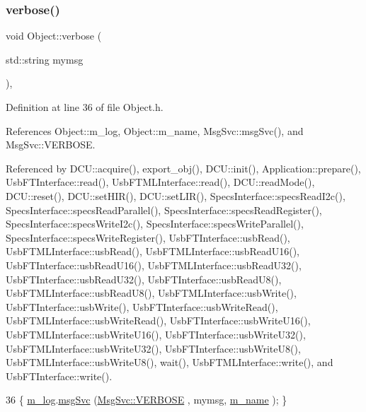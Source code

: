 \subsubsection{\texorpdfstring{verbose()}{verbose()}\hspace{0.1cm}{\footnotesize\ttfamily [1/2]}}
{\footnotesize\ttfamily void Object\+::verbose (\begin{DoxyParamCaption}\item[{std\+::string}]{mymsg }\end{DoxyParamCaption})\hspace{0.3cm}{\ttfamily [inline]}, {\ttfamily [inherited]}}



Definition at line 36 of file Object.\+h.



References Object\+::m\+\_\+log, Object\+::m\+\_\+name, Msg\+Svc\+::msg\+Svc(), and Msg\+Svc\+::\+V\+E\+R\+B\+O\+SE.



Referenced by D\+C\+U\+::acquire(), export\+\_\+obj(), D\+C\+U\+::init(), Application\+::prepare(), Usb\+F\+T\+Interface\+::read(), Usb\+F\+T\+M\+L\+Interface\+::read(), D\+C\+U\+::read\+Mode(), D\+C\+U\+::reset(), D\+C\+U\+::set\+H\+I\+R(), D\+C\+U\+::set\+L\+I\+R(), Specs\+Interface\+::specs\+Read\+I2c(), Specs\+Interface\+::specs\+Read\+Parallel(), Specs\+Interface\+::specs\+Read\+Register(), Specs\+Interface\+::specs\+Write\+I2c(), Specs\+Interface\+::specs\+Write\+Parallel(), Specs\+Interface\+::specs\+Write\+Register(), Usb\+F\+T\+Interface\+::usb\+Read(), Usb\+F\+T\+M\+L\+Interface\+::usb\+Read(), Usb\+F\+T\+M\+L\+Interface\+::usb\+Read\+U16(), Usb\+F\+T\+Interface\+::usb\+Read\+U16(), Usb\+F\+T\+M\+L\+Interface\+::usb\+Read\+U32(), Usb\+F\+T\+Interface\+::usb\+Read\+U32(), Usb\+F\+T\+Interface\+::usb\+Read\+U8(), Usb\+F\+T\+M\+L\+Interface\+::usb\+Read\+U8(), Usb\+F\+T\+M\+L\+Interface\+::usb\+Write(), Usb\+F\+T\+Interface\+::usb\+Write(), Usb\+F\+T\+Interface\+::usb\+Write\+Read(), Usb\+F\+T\+M\+L\+Interface\+::usb\+Write\+Read(), Usb\+F\+T\+Interface\+::usb\+Write\+U16(), Usb\+F\+T\+M\+L\+Interface\+::usb\+Write\+U16(), Usb\+F\+T\+Interface\+::usb\+Write\+U32(), Usb\+F\+T\+M\+L\+Interface\+::usb\+Write\+U32(), Usb\+F\+T\+Interface\+::usb\+Write\+U8(), Usb\+F\+T\+M\+L\+Interface\+::usb\+Write\+U8(), wait(), Usb\+F\+T\+M\+L\+Interface\+::write(), and Usb\+F\+T\+Interface\+::write().


\begin{DoxyCode}
36 \{ \hyperlink{classObject_a0d269813dd7ac1f24bc143031e2963f2}{m\_log}.\hyperlink{classMsgSvc_ad25f18047920cc59a314e5098259711c}{msgSvc} (\hyperlink{classMsgSvc_ae671eb7301996cd049d2da8a65925926af655256b06494ade5ba830abe5401ec9}{MsgSvc::VERBOSE} , mymsg, \hyperlink{classObject_a8b83c95c705d2c3ba0d081fe1710f48d}{m\_name} ); \}
\end{DoxyCode}
\mbox{\label{classObject_a2d4120195317e2a3c6532e8bb9f3da68}} 
